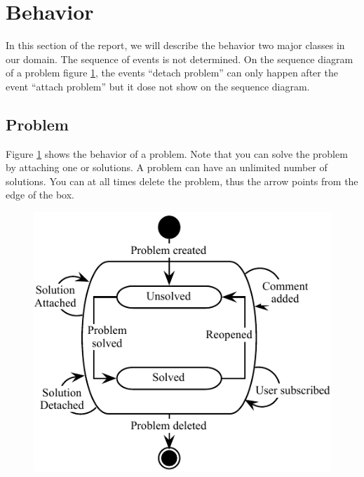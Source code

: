  \section{Behavior}
In this section of the report, we will describe the behavior two major classes in our domain. 
The sequence of events is not determined. On the sequence diagram of a problem figure \ref{fig:Klasse_diagram_problem}, the events ``detach problem'' can only happen after the event ``attach problem'' but it dose not show on the sequence diagram.      


\subsection{Problem}
\label{sub:problem}
Figure \ref{fig:Klasse_diagram_problem} shows the behavior of a problem. Note that you can solve the problem by attaching one or solutions. A problem can have an unlimited number of solutions. You can at all times delete the problem, thus the arrow points from the edge of the box.
\begin{figure}[H]
\begin{center}
\includegraphics[scale=1]{input/problem_domain_analysis/Klassediagram_problem.pdf}
\label{fig:Klasse_diagram_problem}
\end{center}
\end{figure}


